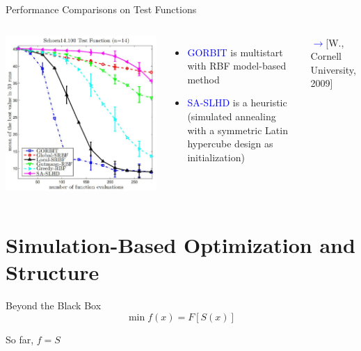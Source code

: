 \documentclass[handout,aspectratio=54]{beamer}
\numberwithin{theorem}{section}
\begin{document}
\begin{frame}{Performance Comparisons on Test Functions}
\begin{columns}
\includegraphics[width=\textwidth]{fig/40.jpg}

\begin{itemize}
\item \ttfamily
\textcolor{blue}{GORBIT} 
\sffamily
is multistart with RBF model-based method
\item \ttfamily
\textcolor{blue}{SA-SLHD} 
\sffamily
is a heuristic (simulated annealing with a symmetric Latin hypercube design as initialization)
\end{itemize}
\footnotesize
\textcolor{blue}{$\rightarrow$}\textcolor[RGB]{128,0,128}{[W., Cornell University, 2009]}
\end{columns}
\end{frame}

\section{Simulation-Based Optimization and Structure}

\begin{frame}{Beyond the Black Box}
\begin{equation*}
\min f(x)=F[S(x)]
\end{equation*}

So far, $f=S$

\vspace{2cm}
\end{frame}
\end{document}
